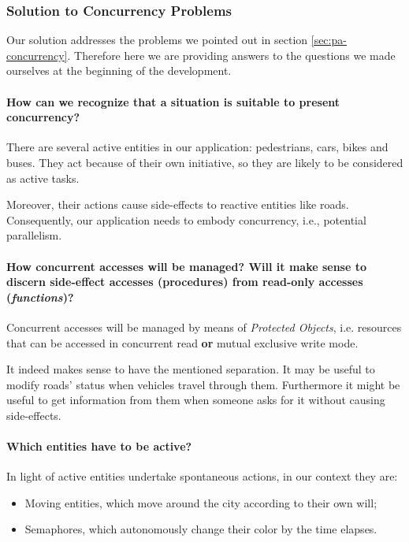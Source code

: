 
\subsubsection{Solution to Concurrency Problems}

Our solution addresses the problems we pointed out in section
\ref{sec:pa-concurrency}. Therefore here we are providing answers to the
questions we made ourselves at the beginning of the development.

\paragraph{How can we recognize that a situation is suitable to present
concurrency?}
There are several active entities in our application: pedestrians, cars, bikes
and buses. They act because of their own initiative, so they are likely to be
considered as active tasks.

Moreover, their actions cause side-effects to reactive entities like roads.
Consequently, our application needs to embody concurrency, i.e., potential
parallelism.

\paragraph{How concurrent accesses will be managed? Will it make sense to
discern side-effect accesses (procedures) from read-only accesses
(\textit{functions})?}
Concurrent accesses will be managed by means of \textit{Protected Objects},
i.e. resources that can be accessed in concurrent read
\textbf{or} mutual exclusive write mode.

It indeed makes sense to have the mentioned separation.
It may be useful to modify roads' status when vehicles travel through them.
Furthermore it might be useful to get information from them
when someone asks for it without causing side-effects.

\paragraph{Which entities have to be active?}
In light of active entities undertake spontaneous actions, in our context they
are:
\begin{itemize}
  \item Moving entities, which move around the city according to their own will;
  \item Semaphores, which autonomously change their color by the time elapses.
\end{itemize}

